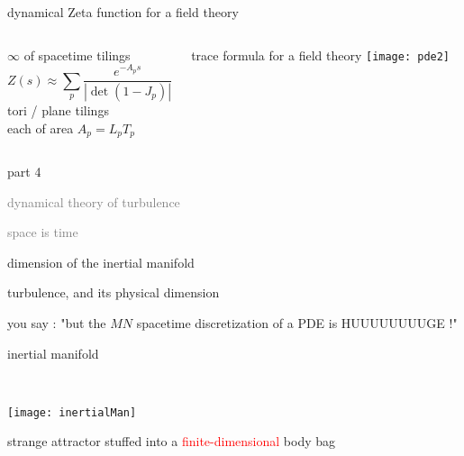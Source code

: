 \begin{frame}{dynamical Zeta function for a field theory}
  \begin{columns}
\begin{block}{$\infty$ of spacetime tilings}
\[
Z(s) \approx
\sum_{p} \frac{e^{-A_p s}}
              {\left|\det(1-J_p)\right|}
\]
tori / plane tilings
\\
each of area $A_p = L_p T_p$
\end{block}
\begin{block}{trace formula  for a field theory}
\texttt{[image: pde2]}%
\end{block}
  \end{columns}
\end{frame}


\begin{frame}{part 4}
\begin{enumerate}
              \item
    \textcolor{gray}{\small
dynamical theory of turbulence
              \item
\statesp
              \item
space is time
    }
              \item
    {\Large
dimension of the inertial manifold
                    }
            \end{enumerate}
\end{frame}

\begin{frame}{turbulence, and its physical dimension}

you say : "but the $MN$ spacetime discretization of a PDE is HUUUUUUUUGE !"

    \begin{minipage}[b]{0.30\textwidth}
\begin{block}{inertial
 manifold
}
\end{block}
    \end{minipage}
~~~~~~
    \begin{minipage}[b]{0.60\textwidth}
\begin{center}
\texttt{[image: inertialMan]}
\end{center}
    \end{minipage}

\medskip
strange attractor stuffed into
a \textcolor{red}{\Large finite-dimensional} body bag
\end{frame}

